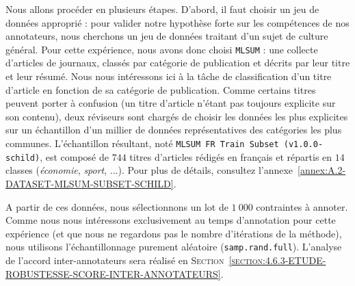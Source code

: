 			Nous allons procéder en plusieurs étapes.
			D'abord, il faut choisir un jeu de données approprié : pour valider notre hypothèse forte sur les compétences de nos annotateurs, nous cherchons un jeu de données traitant d'un sujet de culture général.
			Pour cette expérience, nous avons donc choisi \texttt{MLSUM} : une collecte d'articles de journaux, classés par catégorie de publication et décrits par leur titre et leur résumé.
			Nous nous intéressons ici à la tâche de classification d'un titre d'article en fonction de sa catégorie de publication.
			Comme certains titres peuvent porter à confusion (un titre d'article n'étant pas toujours explicite sur son contenu), deux réviseurs sont chargés de choisir les données les plus explicites sur un échantillon d'un millier de données représentatives des catégories les plus communes.
			L'échantillon résultant, noté \texttt{MLSUM FR Train Subset (v1.0.0-schild)}, est composé de $744$ titres d'articles rédigés en français et répartis en $14$ classes (\textit{économie}, \textit{sport}, ...).
			Pour plus de détails, consultez l'annexe~\ref{annex:A.2-DATASET-MLSUM-SUBSET-SCHILD}.
			
			A partir de ces données, nous sélectionnons un lot de $1~000$ contraintes à annoter.
			Comme nous nous intéressons exclusivement au temps d'annotation pour cette expérience (et que nous ne regardons pas le nombre d'itérations de la méthode), nous utilisons l'échantillonnage purement aléatoire (\texttt{samp.rand.full}).
			L'analyse de l'accord inter-annotateurs sera réalisé en \textsc{Section~\ref{section:4.6.3-ETUDE-ROBUSTESSE-SCORE-INTER-ANNOTATEURS}}.
			
